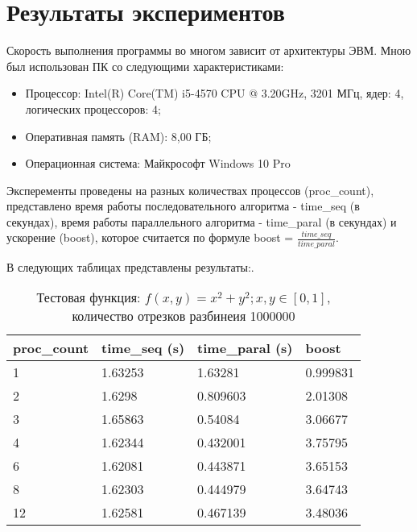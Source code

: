 \documentclass{report}
\begin{document}
\section*{Результаты экспериментов}
Скорость выполнения программы во многом зависит от архитектуры ЭВМ. Мною был использован ПК со следующими характеристиками:
\begin{itemize}
\item Процессор: Intel(R) Core(TM) i5-4570 CPU @ 3.20GHz, 3201 МГц, ядер: 4, логических процессоров: 4;
\item Оперативная память (RAM): 8,00 ГБ;
\item Операционная система: Майкрософт Windows 10 Pro
\end{itemize}
\par Эксперементы проведены на разных количествах процессов (proc\_count), представлено время работы последовательного алгоритма - time\_seq (в секундах), время работы параллельного алгоритма - time\_paral (в секундах) и ускорение (boost), которое считается по формуле boost = $\frac{time\_seq}{time\_paral}$.

\par В следующих таблицах представлены результаты:.

\begin{table}[!h]
\centering
\begin{tabular}{| p{2cm} | p{3cm} | p{3cm} | p{2cm} |}
\hline
proc\_count & time\_seq (s) & time\_paral (s) & boost  \\[5pt]
\hline
1        & 1.63253        & 1.63281      & 0.999831  \\
2        & 1.6298         & 0.809603     & 2.01308   \\
3        & 1.65863        & 0.54084      & 3.06677   \\
4        & 1.62344        & 0.432001     & 3.75795   \\
6        & 1.62081        & 0.443871     & 3.65153   \\
8        & 1.62303        & 0.444979     & 3.64743	 \\
12       & 1.62581        & 0.467139     & 3.48036	 \\
\hline
\end{tabular}
\caption{Тестовая функция: $f(x, y) = x^2 + y^2; x, y \in [0, 1]$, количество отрезков разбинеия 1000000}
\end{table}
\end{document}
